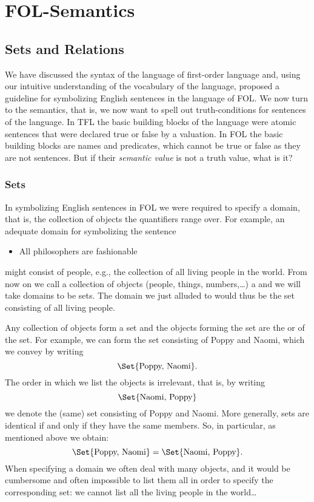 \part{FOL-Semantics}
\label{ch.semantics}

\chapter{Sets and Relations}
We have discussed the syntax of the language of first-order language and, using our intuitive understanding of the vocabulary of the language, proposed a guideline for symbolizing English sentences in the language of FOL. We now turn to the semantics, that is, we now want to spell out truth-conditions for sentences of the language. In TFL the basic building blocks of the language were atomic sentences that were declared true or false by a valuation. In FOL the basic building blocks are names and predicates, which cannot be true or false as they are not sentences. But if their \emph{semantic value} is not a truth value, what is it?


\section{Sets}
In symbolizing English sentences in FOL we were required to specify a domain, that is, the collection of objects the quantifiers range over. For example, an adequate domain for symbolizing the sentence
\begin{itemize}
\item All philosophers are fashionable
\end{itemize}
might consist of people, e.g.,  the collection of all living people in the world. From now on we call a collection of objects (people, things, numbers,\ldots) a  and we will take domains to be sets. The domain we just alluded to would thus be the set consisting of all living people.

Any collection of objects form a set and the objects forming the set are the  or  of the set. For example, we can form the set consisting of Poppy and Naomi, which we convey by writing
$$\Set{\text{Poppy, Naomi}}.$$
The order in which we list the objects is irrelevant, that is, by writing
$$\Set{\text{Naomi, Poppy}}$$
we denote the (same) set consisting of Poppy and Naomi. More generally, sets are identical if and only if they have the same members. So, in particular, as mentioned above we obtain:
$$\Set{\text{Poppy, Naomi}}=\Set{\text{Naomi, Poppy}}.$$  
When specifying a domain we often deal with many objects, and it would be cumbersome and often impossible to list them all in order to specify the corresponding set: we cannot list all the living people in the world\ldots

